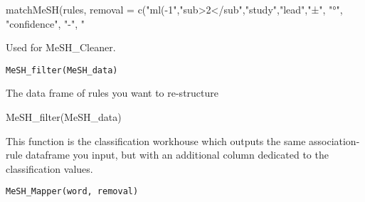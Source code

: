 \documentclass[a4paper]{book}
\begin{document}
%
\begin{Examples}
\begin{ExampleCode}
matchMeSH(rules, removal = c("ml(-1","sub>2</sub","study","lead","±", "°", "confidence", "-", "%
\end{ExampleCode}
\end{Examples}
%
\begin{Description}\relax
Used for MeSH\_Cleaner.
\end{Description}
%
\begin{Usage}
\begin{verbatim}
MeSH_filter(MeSH_data)
\end{verbatim}
\end{Usage}
%
\begin{Arguments}
\begin{ldescription}
\item[\code{MeSH\_data}] The data frame of rules you want to re-structure
\end{ldescription}
\end{Arguments}
%
\begin{Examples}
\begin{ExampleCode}
MeSH_filter(MeSH_data)
\end{ExampleCode}
\end{Examples}
%
\begin{Description}\relax
This function is the classification workhouse which outputs the same association-rule dataframe you input, but with an additional column dedicated to the classification values.
\end{Description}
%
\begin{Usage}
\begin{verbatim}
MeSH_Mapper(word, removal)
\end{verbatim}
\end{Usage}
\end{document}
